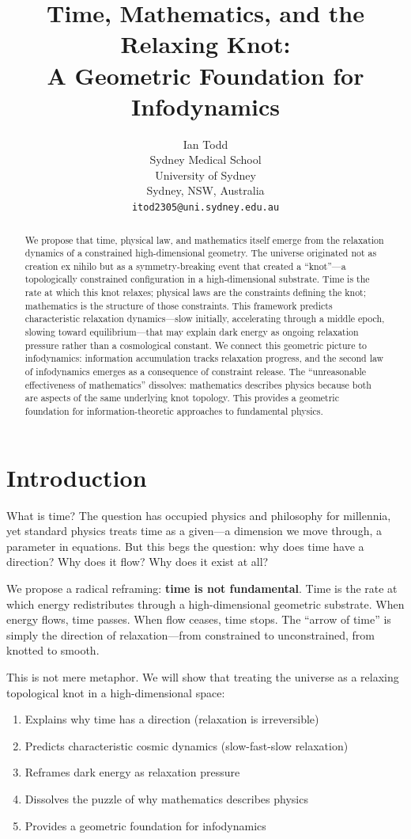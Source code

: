 \documentclass[11pt,a4paper]{article}
\title{Time, Mathematics, and the Relaxing Knot:\\
A Geometric Foundation for Infodynamics}
\author{Ian Todd\\
Sydney Medical School\\
University of Sydney\\
Sydney, NSW, Australia\\
\texttt{itod2305@uni.sydney.edu.au}}
\date{}
\begin{document}
\maketitle

\begin{abstract}
We propose that time, physical law, and mathematics itself emerge from the relaxation dynamics of a constrained high-dimensional geometry. The universe originated not as creation ex nihilo but as a symmetry-breaking event that created a ``knot''---a topologically constrained configuration in a high-dimensional substrate. Time is the rate at which this knot relaxes; physical laws are the constraints defining the knot; mathematics is the structure of those constraints. This framework predicts characteristic relaxation dynamics---slow initially, accelerating through a middle epoch, slowing toward equilibrium---that may explain dark energy as ongoing relaxation pressure rather than a cosmological constant. We connect this geometric picture to infodynamics: information accumulation tracks relaxation progress, and the second law of infodynamics emerges as a consequence of constraint release. The ``unreasonable effectiveness of mathematics'' dissolves: mathematics describes physics because both are aspects of the same underlying knot topology. This provides a geometric foundation for information-theoretic approaches to fundamental physics.
\end{abstract}

\section{Introduction}

What is time? The question has occupied physics and philosophy for millennia, yet standard physics treats time as a given---a dimension we move through, a parameter in equations. But this begs the question: why does time have a direction? Why does it flow? Why does it exist at all?

We propose a radical reframing: \textbf{time is not fundamental}. Time is the rate at which energy redistributes through a high-dimensional geometric substrate. When energy flows, time passes. When flow ceases, time stops. The ``arrow of time'' is simply the direction of relaxation---from constrained to unconstrained, from knotted to smooth.

This is not mere metaphor. We will show that treating the universe as a relaxing topological knot in a high-dimensional space:
\begin{enumerate}
    \item Explains why time has a direction (relaxation is irreversible)
    \item Predicts characteristic cosmic dynamics (slow-fast-slow relaxation)
    \item Reframes dark energy as relaxation pressure
    \item Dissolves the puzzle of why mathematics describes physics
    \item Provides a geometric foundation for infodynamics
\end{enumerate}
\end{document}
